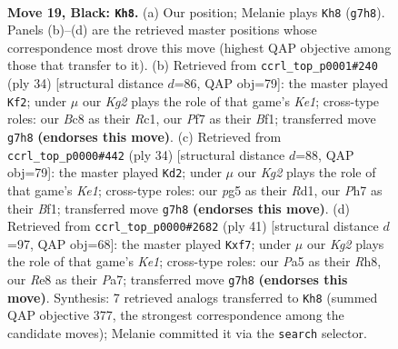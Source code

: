 \documentclass[11pt]{article}
\begin{document}
\clearpage

\begin{figure}[p]\centering
\begin{subfigure}{0.46\textwidth}\centering
\resizebox{\linewidth}{!}{%
\newchessgame
\chessboard[
  setfen={rnb1r3/1p2npkp/4p2Q/p1P1P1P1/5P2/P7/2q1B3/R1B1K1NR b KQ - 1 19},
  showmover=false,
  pgfstyle=straightmove, color=movearrow, markmove={g7-h8}
]}
\caption{}
\end{subfigure}\hfill
\begin{subfigure}{0.46\textwidth}\centering
\resizebox{\linewidth}{!}{%
\newchessgame
\chessboard[
  setfen={r1br4/pp3pk1/2n3pp/2Q4P/4P3/5P2/PP1qN1P1/2R1KB1R w K - 1 18},
  showmover=false,
  pgfstyle=straightmove, color=movearrow, markmove={e1-f2}
]}
\caption{}
\end{subfigure}
\\[4pt]
\begin{subfigure}{0.46\textwidth}\centering
\resizebox{\linewidth}{!}{%
\newchessgame
\chessboard[
  setfen={r1b2rk1/pp2p2p/n5p1/3NQ3/2p5/8/PP2PqP1/3RKB1R w K - 0 18},
  showmover=false,
  pgfstyle=straightmove, color=movearrow, markmove={e1-d2}
]}
\caption{}
\end{subfigure}\hfill
\begin{subfigure}{0.46\textwidth}\centering
\resizebox{\linewidth}{!}{%
\newchessgame
\chessboard[
  setfen={r3k2r/ppqnbBpb/2p4p/4P2P/PP4P1/2N2P2/3Q2K1/R1B4R b kq - 0 21},
  showmover=false,
  pgfstyle=straightmove, color=movearrow, markmove={e8-f7}
]}
\caption{}
\end{subfigure}
\caption{\textbf{Move 19, Black: \texttt{Kh8}.} (a) Our position; Melanie plays \texttt{Kh8} (\texttt{g7h8}). Panels (b)--(d) are the retrieved master positions whose correspondence most drove this move (highest QAP objective among those that transfer to it). (b) Retrieved from \texttt{ccrl\_top\_p0001\#240} (ply 34) [structural distance $d$=86, QAP obj=79]: the master played \texttt{Kf2}; under $\mu$ our \emph{Kg2} plays the role of that game's \emph{Ke1}; cross-type roles: our \emph{B}c8 as their \emph{R}c1, our \emph{P}f7 as their \emph{B}f1; transferred move \texttt{g7h8} \textbf{(endorses this move)}. (c) Retrieved from \texttt{ccrl\_top\_p0000\#442} (ply 34) [structural distance $d$=88, QAP obj=79]: the master played \texttt{Kd2}; under $\mu$ our \emph{Kg2} plays the role of that game's \emph{Ke1}; cross-type roles: our \emph{p}g5 as their \emph{R}d1, our \emph{P}h7 as their \emph{B}f1; transferred move \texttt{g7h8} \textbf{(endorses this move)}. (d) Retrieved from \texttt{ccrl\_top\_p0000\#2682} (ply 41) [structural distance $d$=97, QAP obj=68]: the master played \texttt{Kxf7}; under $\mu$ our \emph{Kg2} plays the role of that game's \emph{Ke1}; cross-type roles: our \emph{P}a5 as their \emph{R}h8, our \emph{R}e8 as their \emph{P}a7; transferred move \texttt{g7h8} \textbf{(endorses this move)}. Synthesis: 7 retrieved analogs transferred to \texttt{Kh8} (summed QAP objective 377, the strongest correspondence among the candidate moves); Melanie committed it via the \texttt{search} selector.}
\label{fig:thought-m37}
\end{figure}
\end{document}
